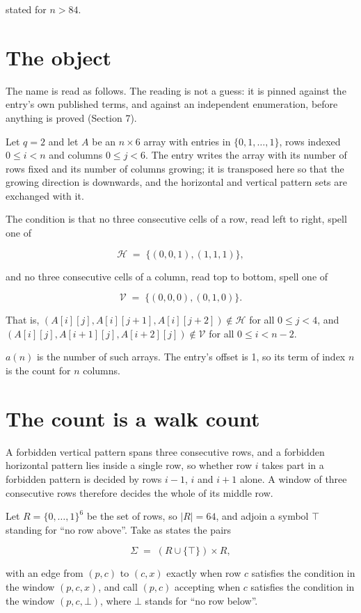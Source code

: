 \documentclass[11pt]{article}
\theoremstyle{definition}
\begin{document}
stated for $n > 84$.

\section{The object}

The name is read as follows. The reading is not a guess: it is pinned against the entry's own published terms, and against an independent enumeration, before anything is proved (Section 7).

Let $q = 2$ and let $A$ be an $n \times 6$ array with entries in $\{0,1,\dots,1\}$, rows indexed $0 \le i < n$ and columns $0 \le j < 6$. The entry writes the array with its number of rows fixed and its number of columns growing; it is transposed here so that the growing direction is downwards, and the horizontal and vertical pattern sets are exchanged with it.

The condition is that no three consecutive cells of a row, read left to right, spell one of

\[\mathcal{H} \;=\; \{(0,0,1), (1,1,1)\},\]

and no three consecutive cells of a column, read top to bottom, spell one of

\[\mathcal{V} \;=\; \{(0,0,0), (0,1,0)\}.\]

That is, $(A[i][j],A[i][j{+}1],A[i][j{+}2]) \notin \mathcal{H}$ for all $0 \le j < 4$, and $(A[i][j],A[i{+}1][j],A[i{+}2][j]) \notin \mathcal{V}$ for all $0 \le i < n-2$.

$a(n)$ is the number of such arrays. The entry's offset is 1, so its term of index $n$ is the count for $n$ columns.

\section{The count is a walk count}

A forbidden vertical pattern spans three consecutive rows, and a forbidden horizontal pattern lies inside a single row, so whether row $i$ takes part in a forbidden pattern is decided by rows $i-1$, $i$ and $i+1$ alone. A window of three consecutive rows therefore decides the whole of its middle row.

Let $R = \{0,\dots,1\}^{6}$ be the set of rows, so $|R| = 64$, and adjoin a symbol $\top$ standing for ``no row above''. Take as states the pairs

\[\Sigma \;=\; (R \cup \{\top\}) \times R,\]

with an edge from $(p,c)$ to $(c,x)$ exactly when row $c$ satisfies the condition in the window $(p,c,x)$, and call $(p,c)$ accepting when $c$ satisfies the condition in the window $(p,c,\bot)$, where $\bot$ stands for ``no row below''.
\end{document}
